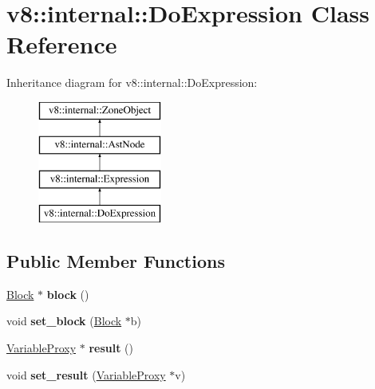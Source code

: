 \hypertarget{classv8_1_1internal_1_1_do_expression}{}\section{v8\+:\+:internal\+:\+:Do\+Expression Class Reference}
\label{classv8_1_1internal_1_1_do_expression}
Inheritance diagram for v8\+:\+:internal\+:\+:Do\+Expression\+:\begin{figure}[H]
\begin{center}
\leavevmode
\includegraphics[height=4.000000cm]{classv8_1_1internal_1_1_do_expression}
\end{center}
\end{figure}
\subsection*{Public Member Functions}
\begin{DoxyCompactItemize}
\item 
\hyperlink{classv8_1_1internal_1_1_block}{Block} $\ast$ {\bfseries block} ()\hypertarget{classv8_1_1internal_1_1_do_expression_ac94604601ec2f5d80a086d698d5d9b28}{}\label{classv8_1_1internal_1_1_do_expression_ac94604601ec2f5d80a086d698d5d9b28}

\item 
void {\bfseries set\+\_\+block} (\hyperlink{classv8_1_1internal_1_1_block}{Block} $\ast$b)\hypertarget{classv8_1_1internal_1_1_do_expression_ab06ee857e00897e3adda2d622995454a}{}\label{classv8_1_1internal_1_1_do_expression_ab06ee857e00897e3adda2d622995454a}

\item 
\hyperlink{classv8_1_1internal_1_1_variable_proxy}{Variable\+Proxy} $\ast$ {\bfseries result} ()\hypertarget{classv8_1_1internal_1_1_do_expression_aad28729b08f77bd0fd60ef2ea8022d57}{}\label{classv8_1_1internal_1_1_do_expression_aad28729b08f77bd0fd60ef2ea8022d57}

\item 
void {\bfseries set\+\_\+result} (\hyperlink{classv8_1_1internal_1_1_variable_proxy}{Variable\+Proxy} $\ast$v)\hypertarget{classv8_1_1internal_1_1_do_expression_a8744a8142c9648b928703c58a0b4df5e}{}\label{classv8_1_1internal_1_1_do_expression_a8744a8142c9648b928703c58a0b4df5e}

\end{DoxyCompactItemize}

